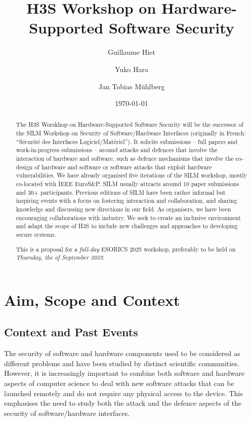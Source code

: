\documentclass[a4paper,11pt]{article}
\title{H3S Workshop on Hardware-Supported Software Security}
\date{\today}
\author{Guillaume Hiet}
\affil{CentraleSupélec/Inria, Rennes, France \\
\url{guillaume.hiet@centralesupelec.fr}}
\author{Yuko Hara}
\affil{Institute of Science, Tokyo, Japan\\
\url{hara@cad.ict.e.titech.ac.jp}}
\author{Jan Tobias M\"uhlberg}
\affil{Universit\'e Libre de Bruxelles, Brussels, Belgium \\
\url{jan.tobias.muehlberg@ulb.be}}
\newcommand{\SILMYear}{2025}
\newcommand{\SILMDate}{Thursday, the \nth{25} of September 2025}
\begin{document}
\maketitle

\begin{abstract}
%
The H3S Worskhop on Hardware-Supported Software Security will be the successor of the 
SILM Workshop on Security of Software/Hardware Interfaces (originally
in French: \enquote{S\'ecurit\'e des Interfaces Logiciel/Mat\'eriel}). It 
solicits submissions -- full papers and work-in-progress submissions --
around attacks and defences that involve the interaction of
hardware and software, such as defence mechanisms that
involve the co-design of hardware and software or software attacks that exploit hardware vulnerabilities. We have already organised
five iterations of the SILM workshop, mostly co-located with IEEE EuroS\&P.
SILM usually attracts around 10 paper submissions and 30+ participants.
Previous editions of SILM have been rather informal but inspiring events
with a focus on fostering interaction and collaboration, and sharing
knowledge and discussing new directions in our field. As organisers, we have
been encouraging collaborations with industry. We seek to create an
inclusive environment and adapt the scope of H3S to include new
challenges and approaches to developing secure systems.

This is a proposal for a \emph{full-day} ESORICS \SILMYear{}
workshop, preferably to be held on
\emph{\SILMDate}.
%
\end{abstract}

\section{Aim, Scope and Context}
%
\subsection{Context and Past Events}
%
The security of software and hardware components used to be considered as
different problems and have been studied by distinct scientific
communities. However, it is increasingly important to combine both software
and hardware aspects of computer science to deal with new software attacks
that can be launched remotely and do not require any physical access to the
device. This emphasises the need to study both the attack and the defence
aspects of the security of software/hardware interfaces.
\end{document}
